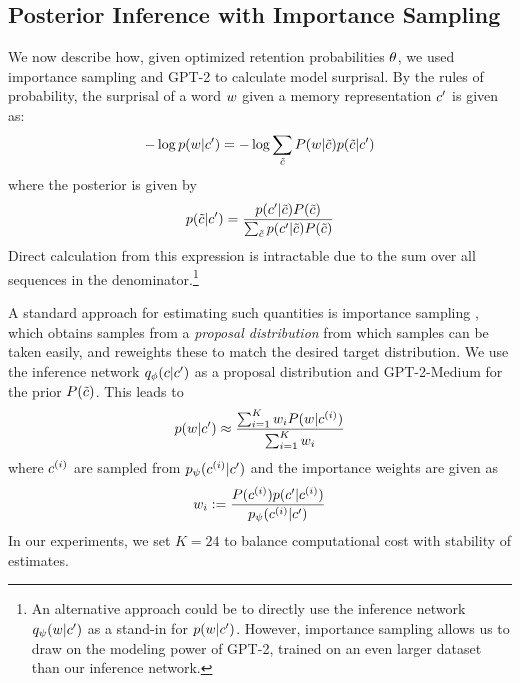 \subsection{Posterior Inference with Importance Sampling}\label{sec:importance}

We now describe how, given optimized retention probabilities $\theta$, we used importance sampling and GPT-2 to calculate model surprisal.
By the rules of probability, the surprisal of a word $w$ given a memory representation $c'$ is given as:
\begin{equation}\label{ref:surp}
-\log p(w|c') =    - \log \sum_{\tilde {c}} P(w|{\tilde {c}}) p({\tilde {c}}|c')
\end{equation}
where the posterior is given by
\begin{equation}\label{eq:ref:posterior-bayes}
p({\tilde {c}}|c') = \frac{ p(c'|{\tilde {c}}) P({\tilde {c}})}{\sum_{\tilde {c}} p(c'|{\tilde {c}}) P({\tilde {c}})}
\end{equation}
Direct calculation from this expression is intractable due to the sum over all sequences in the denominator.\footnote{An alternative approach could be to directly use the inference network $q_\psi(w|c')$ as a stand-in for $p(w|c')$. However, importance sampling allows us to draw on the modeling power of GPT-2, trained on an even larger dataset than our inference network.}


A standard approach for estimating such quantities is importance sampling \citep{Hammersley1954PoorMM}, which obtains samples from a \emph{proposal distribution} from which samples can be taken easily, and reweights these to match the desired target distribution.
We use the inference network  $q_\phi(c|c')$ as a proposal distribution and GPT-2-Medium for the prior $P({\tilde {c}})$.
This leads to
\begin{equation}
p(w|c') \approx \frac{\sum_{i=1}^{K} w_i P(w|c^{(i)})}{\sum_{i=1}^K w_i}
\end{equation}
where $c^{(i)}$ are sampled from $p_\psi(c^{(i)}|c')$ and the importance weights are given as
\begin{equation}
	w_i := \frac{P(c^{(i)}) p(c'|c^{(i)})}{p_\psi(c^{(i)}|c')}
\end{equation}
In our experiments, we set $K=24$ to balance computational cost with stability of estimates.

